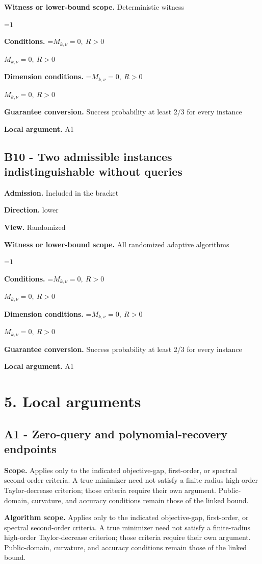 \documentclass[10pt,a4paper]{article}
\newcommand{\AtlasMath}[1]{\par\begingroup\centering\setbox0=\hbox{$\displaystyle #1$}\ifdim\wd0>1.4\linewidth\typeout{ATLAS WIDE FORMULA: \the\wd0}\fi\ifdim\wd0>\linewidth\resizebox{\linewidth}{!}{\box0}\else\box0\fi\par\endgroup}
\newcommand{\AtlasInlineMath}[1]{\begingroup\setbox0=\hbox{$#1$}\ifdim\wd0>.4\linewidth\endgroup\AtlasMath{#1}\else\endgroup$#1$\fi}
\begin{document}
\textbf{Witness or lower-bound scope.} Deterministic witness

\AtlasMath{1}
\textbf{Conditions.} \AtlasInlineMath{M_{k,\nu}=0,\ R>0}

\textbf{Dimension conditions.} \AtlasInlineMath{M_{k,\nu}=0,\ R>0}

\textbf{Guarantee conversion.} Success probability at least 2/3 for every instance

\textbf{Local argument.} A1

\subsection{B10 - Two admissible instances indistinguishable without queries}
\textbf{Admission.} Included in the bracket

\textbf{Direction.} lower

\textbf{View.} Randomized

\textbf{Witness or lower-bound scope.} All randomized adaptive algorithms

\AtlasMath{1}
\textbf{Conditions.} \AtlasInlineMath{M_{k,\nu}=0,\ R>0}

\textbf{Dimension conditions.} \AtlasInlineMath{M_{k,\nu}=0,\ R>0}

\textbf{Guarantee conversion.} Success probability at least 2/3 for every instance

\textbf{Local argument.} A1

\section{5. Local arguments}
\subsection{A1 - Zero-query and polynomial-recovery endpoints}
\textbf{Scope.} Applies only to the indicated objective-gap, first-order, or spectral second-order criteria. A true minimizer need not satisfy a finite-radius high-order Taylor-decrease criterion; those criteria require their own argument. Public-domain, curvature, and accuracy conditions remain those of the linked bound.

\textbf{Algorithm scope.} Applies only to the indicated objective-gap, first-order, or spectral second-order criteria. A true minimizer need not satisfy a finite-radius high-order Taylor-decrease criterion; those criteria require their own argument. Public-domain, curvature, and accuracy conditions remain those of the linked bound.
\end{document}
